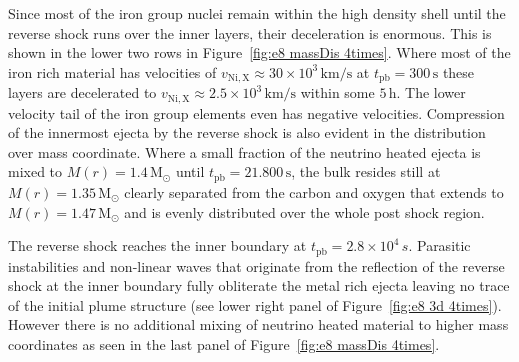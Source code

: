 \documentclass[fleqn,usenatbib]{mnras}
\newcommand{\tpb}{\ensuremath{t_{\text{pb}}}}
\renewcommand{\sec}{\xspace\ensuremath{\text{s}}}
\begin{document}
Since most of the iron group nuclei remain within the high density shell until the reverse shock runs over the inner layers, their deceleration is enormous. This is shown in the lower two rows in Figure~\ref{fig:e8 massDis 4times}. Where most of the iron rich material has velocities of $v_{\mathrm{Ni,X}}\approx 30\times10^3 \,\mathrm{km/s}$ at $t_{\mathrm{pb}}=300\,\text{s}$ these layers are decelerated to $v_{\mathrm{Ni,X}}\approx 2.5\times 10^3\,\mathrm{km/s}$ within some $5 \,\mathrm{h}$. The lower velocity tail of the iron group elements even has negative velocities. 
Compression of the innermost ejecta by the reverse shock is also evident in the distribution over mass coordinate. Where a small fraction of the neutrino heated ejecta is mixed to $M(r)=1.4\,\mathrm{M_{\odot}}$ until $t_{\mathrm{pb}}=21.800\,\sec$, the bulk resides still at  $M(r)=1.35\,\mathrm{M_{\odot}}$ clearly separated from the carbon and oxygen that extends to $M(r)=1.47\,\mathrm{M_{\odot}}$ and is evenly distributed over the whole post shock region.

The reverse shock reaches the inner boundary at $\tpb=2.8\times 10^4\,s$. Parasitic instabilities and non-linear waves that originate from the reflection of the reverse shock at the inner boundary fully obliterate the metal rich ejecta leaving no trace of the initial plume structure (see lower right panel of Figure~\ref{fig:e8 3d 4times}). However there is no additional mixing of neutrino heated material to higher mass coordinates as seen in the last panel of Figure~\ref{fig:e8 massDis 4times}.
\end{document}
